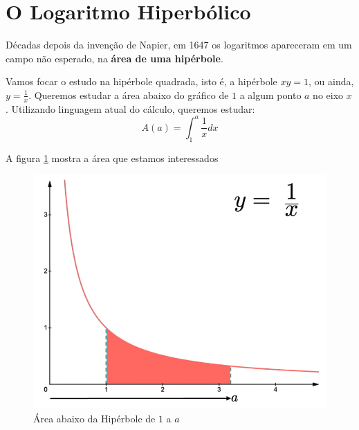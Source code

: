 \section{O Logaritmo Hiperbólico}

Décadas depois da invenção de Napier, em 1647 os logaritmos apareceram em um campo não esperado, na \textbf{área de uma hipérbole}.

Vamos focar o estudo na hipérbole quadrada, isto é, a hipérbole $xy = 1$, ou ainda, $y = \frac{1}{x}$. Queremos estudar a área abaixo do gráfico de $1$ a algum ponto $a$ no eixo $x$. Utilizando linguagem atual do cálculo, queremos estudar:
\[
A(a) = \int_1^a \frac{1}{x} dx
\]

A figura \ref{fig:abaixohiperbole} mostra a área que estamos interessados 

\begin{figure}[H]
    \centering
    \includegraphics[width=0.5\linewidth]{img/areaabaixohip.png}
    \caption{Área abaixo da Hipérbole de $1$ a $a$}
    \label{fig:abaixohiperbole}
\end{figure}

